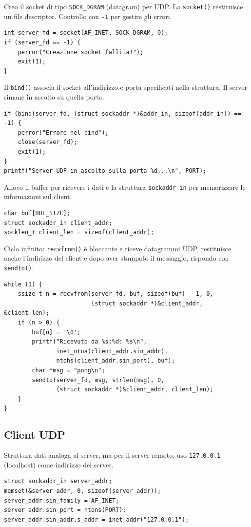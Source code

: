 \documentclass[a4paper,12pt]{article}
\begin{document}
Creo il socket di tipo \texttt{SOCK\_DGRAM} (datagram) per UDP. La \texttt{socket()} restituisce un file descriptor. Controllo con \texttt{-1} per gestire gli errori.
\begin{lstlisting}[caption={server\_udp.c - socket()}]
int server_fd = socket(AF_INET, SOCK_DGRAM, 0);
if (server_fd == -1) {
    perror("Creazione socket fallita!");
    exit(1);
}
\end{lstlisting}
\FloatBarrier

Il \texttt{bind()} associa il socket all'indirizzo e porta specificati nella struttura. Il server rimane in ascolto su quella porta.
\begin{lstlisting}[caption={server\_udp.c - bind()}]
if (bind(server_fd, (struct sockaddr *)&addr_in, sizeof(addr_in)) == -1) {
    perror("Errore nel bind");
    close(server_fd);
    exit(1);
}
printf("Server UDP in ascolto sulla porta %d...\n", PORT);
\end{lstlisting}
\FloatBarrier

Alloco il buffer per ricevere i dati e la struttura \texttt{sockaddr\_in} per memorizzare le informazioni sul client.
\begin{lstlisting}[caption={server\_udp.c - Buffer}]
char buf[BUF_SIZE];
struct sockaddr_in client_addr;
socklen_t client_len = sizeof(client_addr);
\end{lstlisting}
\FloatBarrier

Ciclo infinito: \texttt{recvfrom()} è bloccante e riceve datagrammi UDP,
restituisce anche l'indirizzo del client e dopo aver stampato il messaggio,
rispondo con \texttt{sendto()}.

\begin{lstlisting}[caption={server\_udp.c - recvfrom/sendto}]
while (1) {
    ssize_t n = recvfrom(server_fd, buf, sizeof(buf) - 1, 0,
                         (struct sockaddr *)&client_addr, &client_len);
    if (n > 0) {
        buf[n] = '\0';
        printf("Ricevuto da %s:%d: %s\n", 
               inet_ntoa(client_addr.sin_addr),
               ntohs(client_addr.sin_port), buf);
        char *msg = "pong\n";
        sendto(server_fd, msg, strlen(msg), 0,
               (struct sockaddr *)&client_addr, client_len);
    }
}
\end{lstlisting}
\FloatBarrier

\subsection{Client UDP}

Struttura dati analoga al server, ma per il server remoto,
uso \texttt{127.0.0.1} (localhost) come indirizzo del server.
\begin{lstlisting}[caption={client\_udp.c - sockaddr\_in}]
struct sockaddr_in server_addr;
memset(&server_addr, 0, sizeof(server_addr));
server_addr.sin_family = AF_INET;
server_addr.sin_port = htons(PORT);
server_addr.sin_addr.s_addr = inet_addr("127.0.0.1");
\end{lstlisting}
\FloatBarrier
\end{document}
